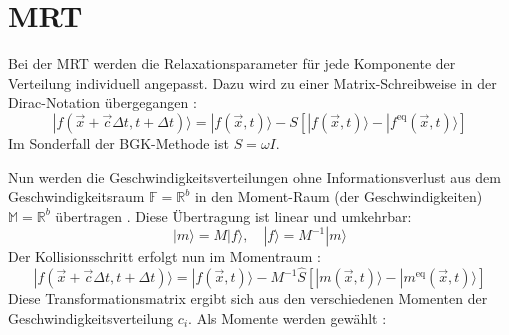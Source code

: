 \documentclass[a4paper,10pt]{scrreprt}
\begin{document}
\section{MRT}
\label{chap:MRT}
Bei der MRT werden die Relaxationsparameter für jede Komponente der Verteilung individuell angepasst. Dazu wird zu einer Matrix-Schreibweise in der Dirac-Notation übergegangen \cite{2002}:
\begin{equation}
\label{eq:MRTbasic}
 | f(\vec{x} + \vec{c} \Delta t, t + \Delta t) \rangle = | f(\vec{x},t) \rangle - S [ | f(\vec{x},t) \rangle - | f^{\text{eq}}(\vec{x},t) \rangle]
\end{equation}
Im Sonderfall der BGK-Methode ist $S = \omega I$.

Nun werden die Geschwindigkeitsverteilungen ohne Informationsverlust aus dem Geschwindigkeitsraum $ \mathbb{F} = \mathbb{R}^b $ in den Moment-Raum (der Geschwindigkeiten) $ \mathbb{M} = \mathbb{R}^b $  übertragen \cite{2002,Lallemand2000,Lallemand2003}. Diese Übertragung ist linear und umkehrbar:
\begin{equation}
 |m\rangle = M | f \rangle, \quad |f\rangle = M^{-1} | m \rangle
\end{equation}
Der Kollisionsschritt erfolgt nun im Momentraum \cite{2002,Lallemand2003}:
\begin{equation}
 | f(\vec{x} + \vec{c} \Delta t, t + \Delta t) \rangle = | f(\vec{x},t) \rangle - M^{-1} \hat{S} [ | m(\vec{x},t) \rangle - | m^{\text{eq}}(\vec{x},t) \rangle]
\end{equation}
Diese Transformationsmatrix ergibt sich aus den verschiedenen Momenten der Geschwindigkeitsverteilung $c_i$. Als Momente werden gewählt \cite{Bouzidi2001}:
\end{document}
